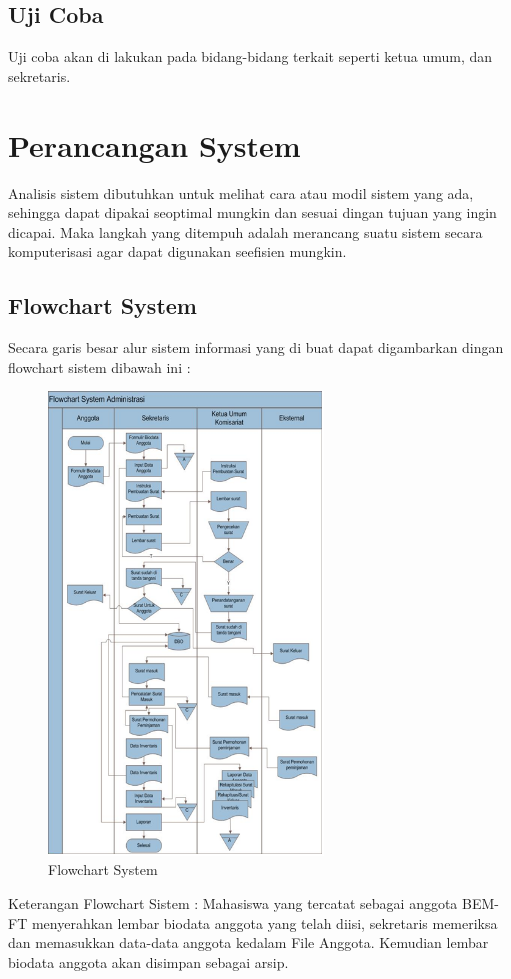 \documentclass{jtetiproposalskripsi}
\begin{document}
\subsection{Uji Coba}
Uji coba akan di lakukan pada bidang-bidang terkait seperti ketua umum, dan sekretaris.
\section{Perancangan System}
Analisis sistem dibutuhkan untuk melihat cara atau modil sistem yang ada, sehingga dapat dipakai seoptimal mungkin dan sesuai dingan tujuan yang ingin dicapai. Maka langkah yang ditempuh adalah merancang suatu sistem secara komputerisasi agar dapat digunakan seefisien mungkin.
\subsection{Flowchart System}
Secara garis besar alur sistem informasi yang di buat dapat digambarkan dingan flowchart sistem dibawah ini :
\begin{figure}[h]
\centering 
 \includegraphics[width=0.65\textwidth]{gambar/5}  
 \caption{Flowchart System}
\end{figure}
\newpage
Keterangan Flowchart Sistem :
Mahasiswa yang tercatat sebagai anggota BEM-FT menyerahkan lembar biodata anggota yang telah diisi, sekretaris memeriksa dan memasukkan data-data anggota kedalam File Anggota. Kemudian lembar biodata anggota akan disimpan sebagai arsip.
\end{document}
